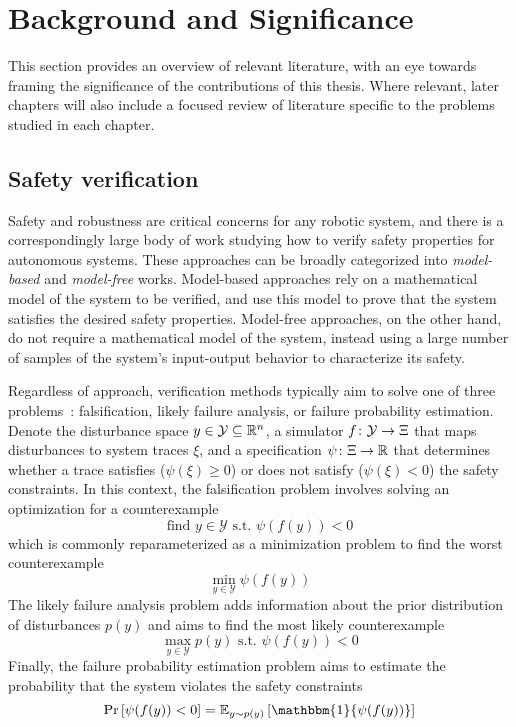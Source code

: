 \chapter{Background and Significance}\label{section:lit_review}

This section provides an overview of relevant literature, with an eye towards framing the significance of the contributions of this thesis. Where relevant, later chapters will also include a focused review of literature specific to the problems studied in each chapter.

\section{Safety verification}

Safety and robustness are critical concerns for any robotic system, and there is a correspondingly large body of work studying how to verify safety properties for autonomous systems. These approaches can be broadly categorized into \textit{model-based} and \textit{model-free} works. Model-based approaches rely on a mathematical model of the system to be verified, and use this model to prove that the system satisfies the desired safety properties. Model-free approaches, on the other hand, do not require a mathematical model of the system, instead using a large number of samples of the system's input-output behavior to characterize its safety.

Regardless of approach, verification methods typically aim to solve one of three problems~\cite{corsoSurveyAlgorithmsBlackBox2021}: falsification, likely failure analysis, or failure probability estimation. Denote the disturbance space $y \in \mathcal{Y} \subseteq \mathbb{R}^n$, a simulator $f \colon \mathcal{Y} \to \Xi$ that maps disturbances to system traces $\xi$, and a specification $\psi \colon \Xi \to \mathbb{R}$ that determines whether a trace satisfies ($\psi(\xi) \geq 0$) or does not satisfy ($\psi(\xi) < 0$) the safety constraints. In this context, the falsification problem involves solving an optimization for a counterexample
%
\begin{equation}
	\text{find } {y \in \mathcal{Y}} \text{ s.t. } \psi(f(y)) < 0
\end{equation}
%
which is commonly reparameterized as a minimization problem to find the worst counterexample
%
\begin{equation}
	\min_{y \in \mathcal{Y}} \psi(f(y))\label{ch4:eq:falsification_opt}
\end{equation}
%
The likely failure analysis problem adds information about the prior distribution of disturbances $p(y)$ and aims to find the most likely counterexample
%
\begin{equation}
	\max_{y \in \mathcal{Y}} p(y) \text{ s.t. } \psi(f(y)) < 0 \label{ch4:eq:likely_failure_opt}
\end{equation}
%
Finally, the failure probability estimation problem aims to estimate the probability that the system violates the safety constraints
%
\begin{equation}
	\Pr\left[\psi(f(y)) < 0\right] = \mathbb{E}_{y \sim p(y)}\left[\mathbbm{1}\{\psi(f(y))\} \right] \label{ch4:eq:failure_probability}
\end{equation}

